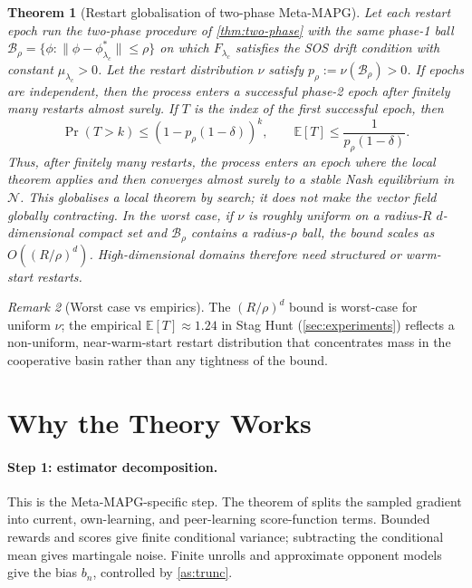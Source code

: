 \documentclass{article}
\theoremstyle{plain}
\newtheorem{theorem}{Theorem}[section]
\theoremstyle{definition}
\theoremstyle{remark}
\newtheorem{remark}[theorem]{Remark}
\newcommand{\E}{\mathbb{E}}
\newcommand{\B}{\mathcal{B}}
\newcommand{\N}{\mathcal{N}}
\begin{document}
\begin{theorem}[Restart globalisation of two-phase Meta-MAPG]\label{thm:restart}
Let each restart epoch run the two-phase procedure of \cref{thm:two-phase} with the same phase-1 ball $\B_\rho=\{\phi:\|\phi-\phi^\ast_{\lambda_c}\|\le\rho\}$ on which $F_{\lambda_c}$ satisfies the SOS drift condition with constant $\mu_{\lambda_c}>0$. Let the restart distribution $\nu$ satisfy $p_\rho:=\nu(\B_\rho)>0$. If epochs are independent, then the process enters a successful phase-2 epoch after finitely many restarts almost surely. If $T$ is the index of the first successful epoch, then
\[
\Pr(T>k)\le (1-p_\rho(1-\delta))^k,\qquad
\E[T]\le \frac{1}{p_\rho(1-\delta)}.
\]
Thus, after finitely many restarts, the process enters an epoch where the local theorem applies and then converges almost surely to a stable Nash equilibrium in $\N$. This globalises a local theorem by search; it does not make the vector field globally contracting. In the worst case, if $\nu$ is roughly uniform on a radius-$R$ $d$-dimensional compact set and $\B_\rho$ contains a radius-$\rho$ ball, the bound scales as $O((R/\rho)^d)$. High-dimensional domains therefore need structured or warm-start restarts.
\end{theorem}

\begin{remark}[Worst case vs empirics]\label{rem:restart-empirics}
The $(R/\rho)^d$ bound is worst-case for uniform $\nu$; the empirical $\E[T]\approx 1.24$ in Stag Hunt (\cref{sec:experiments}) reflects a non-uniform, near-warm-start restart distribution that concentrates mass in the cooperative basin rather than any tightness of the bound.
\end{remark}

\section{Why the Theory Works}\label{sec:proof}

\paragraph{Step 1: estimator decomposition.}
This is the Meta-MAPG-specific step. The theorem of \citet{kim2021meta} splits the sampled gradient into current, own-learning, and peer-learning score-function terms. Bounded rewards and scores give finite conditional variance; subtracting the conditional mean gives martingale noise. Finite unrolls and approximate opponent models give the bias $b_n$, controlled by \cref{as:trunc}.
\end{document}
